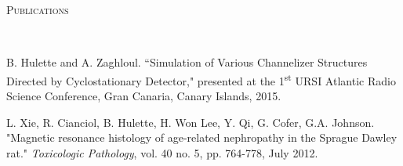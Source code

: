 \documentclass[10pt]{article}
\newenvironment{changemargin}[2]{%
  \begin{list}{}{%
    \setlength{\topsep}{0pt}%
    \setlength{\leftmargin}{#1}%
    \setlength{\rightmargin}{#2}%
    \setlength{\listparindent}{\parindent}%
    \setlength{\itemindent}{\parindent}%
    \setlength{\parsep}{\parskip}%
  }%
  \item[]}{\end{list}
}
\newcommand{\lineover}{
	\begin{changemargin}{-0.05in}{-0.05in}
		\vspace*{-8pt}
		\hrulefill \\
		\vspace*{-2pt}
	\end{changemargin}
}
\newenvironment{body} {
	\begin{changemargin}{-0.25in}{-0.5in}
  }
	{\end{changemargin}
}
\newcommand{\headerrule}[1]{
    \vspace*{5pt}
    \begin{changemargin}{-0.5in}{-0.5in}
        \scshape{#1}\\
    \lineover
    \end{changemargin}
}
\begin{document}
\headerrule{Publications}
\begin{body}
B. Hulette and A. Zaghloul. ``Simulation of Various Channelizer Structures
Directed by Cyclostationary Detector," presented at the 1\textsuperscript{st}
URSI Atlantic Radio Science Conference, Gran Canaria, Canary Islands, 2015.

\vspace{0.25cm}

L. Xie, R. Cianciol, B. Hulette, H. Won Lee, Y. Qi, G. Cofer, G.A. Johnson.
"Magnetic resonance histology of age-related nephropathy in the Sprague
Dawley rat." \emph{Toxicologic Pathology}, vol. 40 no. 5, pp. 764-778, July 2012.
\end{body}
\end{document}
